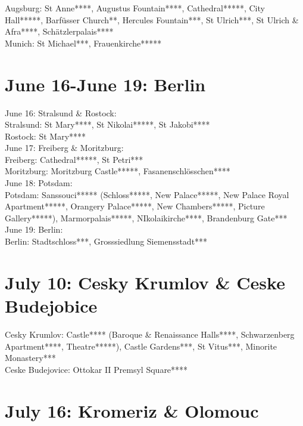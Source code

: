 Augsburg: St Anne****, Augustus Fountain****, Cathedral*****, City Hall*****, Barf\"usser Church**, Hercules Fountain***, St Ulrich***, St Ulrich \& Afra****, Sch\"atzlerpalais****\\
Munich: St Michael***, Frauenkirche*****\\

\section{June 16-June 19:  Berlin}
\label{2022:Berlin}

June 16: Stralsund \& Rostock:\\

Stralsund: St Mary****, St Nikolai*****, St Jakobi****\\
Rostock: St Mary****\\

June 17: Freiberg \& Moritzburg:\\

Freiberg: Cathedral*****, St Petri***\\
Moritzburg: Moritzburg Castle*****, Fasanenschl\"osschen****\\

June 18: Potsdam:\\

Potsdam: Sanssouci***** (Schloss*****, New Palace*****, New Palace Royal Apartment*****, Orangery Palace*****, New Chambers*****, Picture Gallery*****), Marmorpalais*****, NIkolaikirche****, Brandenburg Gate***\\

June 19: Berlin:\\

Berlin: Stadtschloss***, Grosssiedlung Siemensstadt***\\

\section{July 10: Cesky Krumlov \& Ceske Budejobice}
\label{2022:CeskyKrumlov}

Cesky Krumlov: Castle**** (Baroque \& Renaissance Halls****, Schwarzenberg Apartment****, Theatre*****), Castle Gardens***, St Vitus***, Minorite Monastery***\\
Ceske Budejovice: Ottokar II Premsyl Square****\\

\section{July 16:  Kromeriz \& Olomouc}
\label{2022:KromerizOlomouc}

